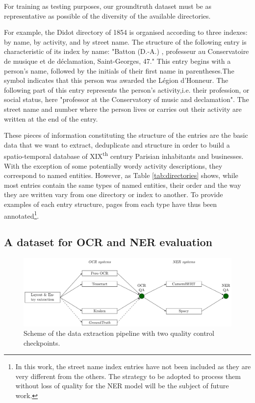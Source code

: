 For training as testing purposes, our groundtruth dataset must be as representative as possible of the diversity of the available directories. 

For example, the Didot directory of 1854 is organised according to three indexes: by name, by activity, and by street name. The structure of the following entry is characteristic of its index by name: "Batton (D.-A.) , professeur au Conservatoire de musique et de déclamation, Saint-Georges, 47." This entry begins with a person's name, followed by the initials of their first name in parentheses.The symbol indicates that this person was awarded the Légion d'Honneur. The following part of this entry represents the person's activity,i.e. their profession, or social status, here "professor at the Conservatory of music and declamation". The street name and number where the person lives or carries out their activity are written at the end of the entry.

These pieces of information constituting the structure of the entries are the basic data that we want to extract, deduplicate and structure in order to build a spatio-temporal database of XIX\textsuperscript{th} century Parisian inhabitants and businesses. With the exception of some potentially wordy activity descriptions, they correspond to named entities. However, as Table \ref{tab:directories} shows, while most entries contain the same types of named entities, their order and the way they are written vary from one directory or index to another. To provide examples of each entry structure, pages from each type have thus been annotated\footnote{In this work, the street name index entries have not been included as they are very different from the others. The strategy to be adopted to process them without loss of quality for the NER model will be the subject of future work.}.


\subsection{A dataset for OCR and NER evaluation}


\begin{figure}[tb]
    \includegraphics[width=\linewidth]{figs/protocol.pdf}
    \caption{Scheme of the data extraction pipeline with two quality control checkpoints. }
    \label{fig.pipeline}
\end{figure}


